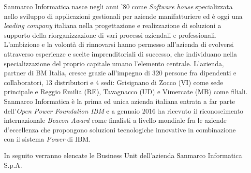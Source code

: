     Sanmarco Informatica nasce negli anni '80 come \textit{Software house} specializzata nello sviluppo di applicazioni gestionali per aziende manifatturiere ed è oggi una \textit{leading company} italiana nella progettazione e realizzazione di soluzioni a supporto della riorganizzazione di vari processi aziendali e professionali. L'ambizione e la volontà di rinnovarsi hanno permesso all'azienda di evolversi attraverso esperienze  e scelte imprenditoriali di successo, che individuano nella specializzazione del proprio capitale umano l'elemento centrale. L'azienda, partner di BM Italia, cresce grazie all'impegno di 320 persone fra dipendenti e collaboratori, 13 distributori e 4 sedi: Grisignano di Zocco (VI) come sede principale e Reggio Emilia (RE), Tavagnacco (UD) e Vimercate (MB) come filiali.
Sanmarco Informatica è la prima ed unica azienda italiana entrata a far parte dell'\textit{\gls{Open Power Foundation IBM}} e a gennaio 2016 ha ricevuto il riconoscimento internazionale \textit{Beacon Award} come finalisti a livello mondiale fra le aziende d'eccellenza che propongono soluzioni tecnologiche innovative in combinazione con il sistema \textit{Power} di IBM.

In seguito verranno elencate le Business Unit dell'azienda Sanmarco Informatica S.p.A. 



